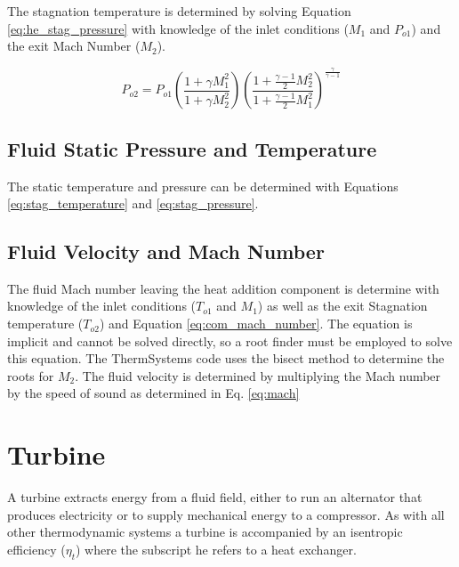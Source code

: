 The stagnation temperature is determined by solving Equation \ref{eq:he_stag_pressure} with knowledge of the inlet conditions 
($M_1$ and $P_{o1}$) and the exit Mach Number ($M_2$).

\begin{equation}
\label{eq:he_stag_pressure}
P_{o2} = P_{o1}\left(\frac{1 + \gamma M^2_1}{1 + \gamma M^2_2} \right) \left(\frac{1 + \frac{\gamma - 1}{2}M^2_2}{1 + \frac{\gamma -1}{2}M^2_1} \right)^{\frac{\gamma}{\gamma - 1}}
\end{equation}

\subsection{Fluid Static Pressure and Temperature}
The static temperature and pressure can be determined with Equations \ref{eq:stag_temperature} and \ref{eq:stag_pressure}.

\subsection{Fluid Velocity and Mach Number}
The fluid Mach number leaving the heat addition component is determine with knowledge of the inlet conditions ($T_{o1}$ and $M_1$) as
well as the exit Stagnation temperature ($T_{o2}$) and Equation \ref{eq:com_mach_number}.  The equation is implicit and cannot be solved
directly, so a root finder must be employed to solve this equation.  The ThermSystems code uses the bisect method to determine the roots
for $M_2$.  The fluid velocity is determined by multiplying the Mach number by the speed of sound as determined in Eq. \ref{eq:mach}

\section{Turbine}
A turbine extracts energy from a fluid field, either to run an alternator that produces electricity or to supply mechanical energy to
a compressor.  As with all other thermodynamic systems a turbine is accompanied by an isentropic efficiency ($\eta_{t}$) 
where the subscript he refers to a heat exchanger.

